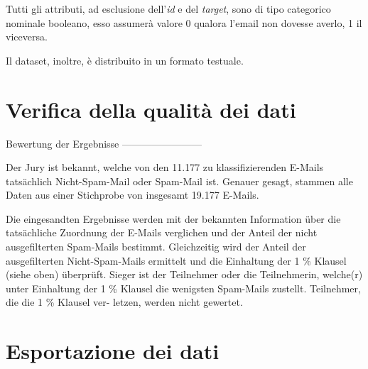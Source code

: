 Tutti gli attributi, ad esclusione dell'\textit{id} e del \textit{target}, sono di tipo categorico nominale booleano, esso assumerà valore 0 qualora l'email non dovesse averlo, 1 il viceversa.

Il dataset, inoltre, è distribuito in un formato testuale.
\section{Verifica della qualità dei dati}

Bewertung der Ergebnisse
------------------------

Der Jury ist bekannt, welche von den 11.177 zu klassifizierenden
E-Mails tatsächlich Nicht-Spam-Mail oder Spam-Mail ist. Genauer
gesagt, stammen alle Daten aus einer Stichprobe von insgesamt
19.177 E-Mails.

Die eingesandten Ergebnisse werden mit der bekannten Information über
die tatsächliche Zuordnung der E-Mails verglichen und der Anteil der
nicht ausgefilterten Spam-Mails bestimmt. Gleichzeitig wird der Anteil
der ausgefilterten Nicht-Spam-Mails ermittelt und die Einhaltung
der 1 \% Klausel (siehe oben) überprüft. Sieger ist der Teilnehmer
oder die Teilnehmerin, welche(r) unter Einhaltung der 1 \% Klausel die
wenigsten Spam-Mails zustellt. Teilnehmer, die die 1 \% Klausel ver-
letzen, werden nicht gewertet.

\section{Esportazione dei dati}

